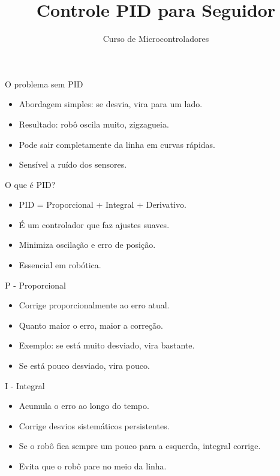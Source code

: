 \documentclass[10pt]{beamer}
\title{Controle PID para Seguidor}
\subtitle{Curso de Microcontroladores}
\author{}
\date{}
\begin{document}
\begin{frame}
  \titlepage
\end{frame}

\begin{frame}{O problema sem PID}
  \begin{itemize}
    \item Abordagem simples: se desvia, vira para um lado.
    \item Resultado: robô oscila muito, zigzagueia.
    \item Pode sair completamente da linha em curvas rápidas.
    \item Sensível a ruído dos sensores.
  \end{itemize}
\end{frame}

\begin{frame}{O que é PID?}
  \begin{itemize}
    \item PID = Proporcional + Integral + Derivativo.
    \item É um controlador que faz ajustes suaves.
    \item Minimiza oscilação e erro de posição.
    \item Essencial em robótica.
  \end{itemize}
\end{frame}

\begin{frame}{P - Proporcional}
  \begin{itemize}
    \item Corrige proporcionalmente ao erro atual.
    \item Quanto maior o erro, maior a correção.
    \item Exemplo: se está muito desviado, vira bastante.
    \item Se está pouco desviado, vira pouco.
  \end{itemize}
\end{frame}

\begin{frame}{I - Integral}
  \begin{itemize}
    \item Acumula o erro ao longo do tempo.
    \item Corrige desvios sistemáticos persistentes.
    \item Se o robô fica sempre um pouco para a esquerda, integral corrige.
    \item Evita que o robô pare no meio da linha.
  \end{itemize}
\end{frame}
\end{document}
